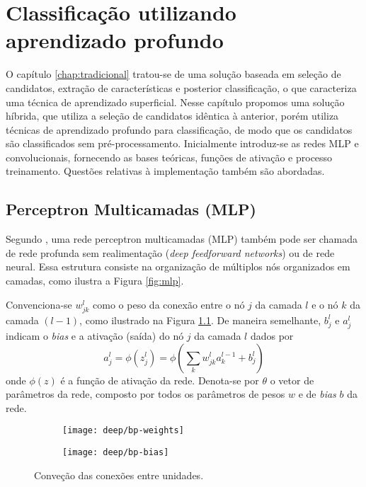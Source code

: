 \chapter{Classificação utilizando aprendizado profundo} \label{chap:class-profundo}
O capítulo \ref{chap:tradicional} tratou-se de uma solução baseada em seleção de candidatos, extração de características e posterior classificação, o que caracteriza uma técnica de aprendizado superficial. Nesse capítulo propomos uma solução híbrida, que utiliza a seleção de candidatos idêntica à anterior, porém utiliza técnicas de aprendizado profundo para classificação, de modo que os candidatos são classificados sem pré-processamento. Inicialmente introduz-se as redes MLP e convolucionais, fornecendo as bases teóricas, funções de ativação e processo treinamento.  Questões relativas à implementação também são abordadas.

\section{Perceptron Multicamadas (MLP)}

Segundo \cite{DLbook}, uma rede perceptron multicamadas (MLP) também pode ser chamada de rede profunda sem realimentação (\textit{deep feedforward networks}) ou de rede neural. Essa estrutura consiste na organização de múltiplos nós organizados em camadas, como ilustra a Figura \ref{fig:mlp}. 
 
Convenciona-se $w_{jk}^l$ como o peso da conexão entre o nó $j$ da camada $l$ e o nó $k$ da camada $(l-1)$, como ilustrado na Figura \ref{fig:bp}. De maneira semelhante, $b^l_j$ e $a^l_j$ indicam o \textit{bias} e a ativação (saída) do nó $j$ da camada $l$ dados por
\begin{equation}
a^l_j = \phi (z^l_j) =\phi \left( \sum_k w_{jk}^l a_k^{l-1} + b_j^l \right)
\end{equation}
onde $\phi(z)$ é a função de ativação da rede. Denota-se por $\theta$ o vetor de parâmetros da rede, composto por todos os parâmetros de pesos $w$ e de \textit{bias} $b$ da rede.

\begin{figure}
\centering
\begin{subfigure}{.5\textwidth}
  \centering
  \texttt{[image: deep/bp-weights]}
\end{subfigure}%
\begin{subfigure}{.5\textwidth}
  \centering
  \texttt{[image: deep/bp-bias]}
\end{subfigure}
\caption{Conveção das conexões entre unidades.}
\label{fig:bp}
\end{figure}

